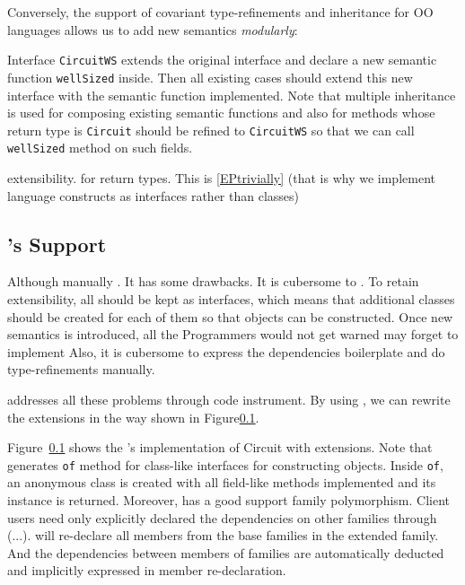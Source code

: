 Conversely, the support of covariant type-refinements and inheritance for OO
languages allows us to add new semantics \emph{modularly}:

Interface \texttt{CircuitWS} extends the original interface and declare a new
semantic function \texttt{wellSized} inside.
Then all existing cases should extend this new interface with the semantic
function implemented. Note that multiple inheritance is used for composing
existing semantic functions and also for methods whose return type is
\texttt{Circuit} should be refined to \texttt{CircuitWS} so that we can call
\texttt{wellSized} method on such fields.

extensibility.
for return types. This is \ref{EPtrivially}
(that is why we implement language constructs as interfaces rather than classes)


\subsection{\name's Support}
Although manually . It has some drawbacks.
It is cubersome to .
To retain extensibility, all should be kept as interfaces, which means that
additional classes should be created for each of them so that objects can be constructed.
Once new semantics is introduced, all the
Programmers would not get warned may forget to implement
Also, it is cubersome to express the dependencies boilerplate and do
type-refinements manually.

\name addresses all these problems through code instrument.
By using \name, we can rewrite the extensions in the way shown in Figure\ref{}.

Figure~\ref{} shows the \name's implementation of Circuit with extensions.
Note that \name generates \texttt{of} method for class-like interfaces for
constructing objects. Inside \texttt{of}, an anonymous class is created with all
field-like methods implemented and its instance is returned.
Moreover, \name has a good support family polymorphism.
Client users need only explicitly declared the dependencies on other families
through (...). \name will re-declare all members from the base families in the extended family.
And the dependencies between members of families are automatically deducted and
implicitly expressed in member re-declaration.
